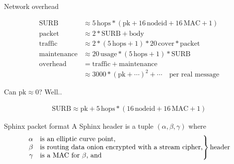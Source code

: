 \documentclass[fleqn,xcolor={usenames,dvipsnames},notes,aspectratio=169]{beamer} %
\begin{document}
\begin{frame}{Network overhead}

\begin{align*}
\mathrm{SURB} &\approx 5\,\mathrm{hops} * (\mathrm{pk} + 16\,\mathrm{nodeid} + 16\,\mathrm{MAC} + 1) \\
\mathrm{packet} &\approx 2 * \mathrm{SURB} + \mathrm{body} \\
\mathrm{traffic} &\approx 2 * (5\,\mathrm{hops} + 1) * 20\,\mathrm{cover} * \mathrm{packet} \\
\mathrm{maintenance} &\approx 20\,\mathrm{usage} * (5\,\mathrm{hops} + 1) *  \mathrm{SURB} \\
\mathrm{overhead} &= \mathrm{traffic} + \mathrm{maintenance} \\
 &\approx 3000 * (\mathrm{pk} + \cdots)^2 + \cdots \quad\textrm{per real message}
\end{align*}

\bigskip\pause

Can $\mathrm{pk} \approx 0$?  Well..

\begin{align*}
\mathrm{SURB} \approx \mathrm{pk} + 5\,\mathrm{hops} * (16\, \mathrm{nodeid} + 16\,\mathrm{MAC} + 1) 
\end{align*}

\end{frame}


\begin{frame}{Sphinx packet format}
A Sphinx header is a tuple $(\alpha,\beta,\gamma)$ where \\

 \vspace*{-18pt} \[
\left. \begin{array}{@{}rl@{}}
  \alpha & \text{is an elliptic curve point,}\\
  \beta & \text{is routing data onion encrypted with a stream cipher,}\\
  \gamma & \text{is a MAC for $\beta$, and} \\
\end{array} \right\} \text{header}
\]  %

\def\svgwidth{\columnwidth}


\end{frame}
\end{document}
